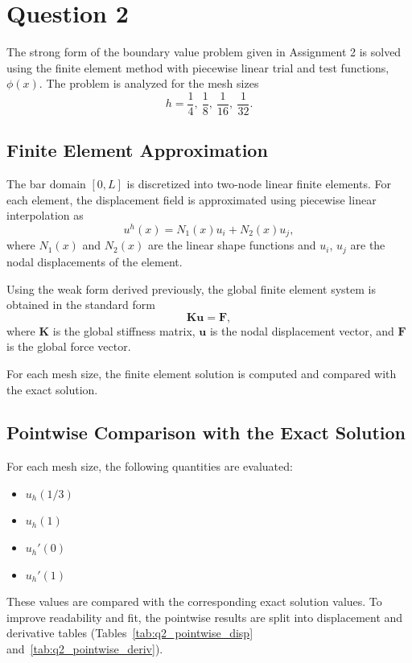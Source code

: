 \section*{Question 2}

The strong form of the boundary value problem given in Assignment 2 is solved using the finite element method with piecewise linear trial and test functions, $\phi(x)$. The problem is analyzed for the mesh sizes
\[
h=\frac{1}{4},\ \frac{1}{8},\ \frac{1}{16},\ \frac{1}{32}.
\]

\subsection*{Finite Element Approximation}

The bar domain $[0,L]$ is discretized into two-node linear finite elements. For each element, the displacement field is approximated using piecewise linear interpolation as
\[
u^h(x)=N_1(x)u_i+N_2(x)u_j,
\]
where $N_1(x)$ and $N_2(x)$ are the linear shape functions and $u_i$, $u_j$ are the nodal displacements of the element.

Using the weak form derived previously, the global finite element system is obtained in the standard form
\[
\mathbf{K}\mathbf{u}=\mathbf{F},
\]
where $\mathbf{K}$ is the global stiffness matrix, $\mathbf{u}$ is the nodal displacement vector, and $\mathbf{F}$ is the global force vector.

For each mesh size, the finite element solution is computed and compared with the exact solution.

\subsection*{Pointwise Comparison with the Exact Solution}

For each mesh size, the following quantities are evaluated:

\begin{itemize}
    \item $u_h(1/3)$
    \item $u_h(1)$
    \item $u_h'(0)$
    \item $u_h'(1)$
\end{itemize}

These values are compared with the corresponding exact solution values. To improve readability and fit, the pointwise results are split into displacement and derivative tables (Tables~\ref{tab:q2_pointwise_disp} and~\ref{tab:q2_pointwise_deriv}).

